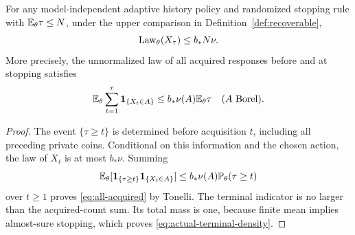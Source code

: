 \begin{lemma}\label{lem:stopped-mass}
For any model-independent adaptive history policy and randomized stopping rule with $\mathbb E_\theta\tau\le N$, under the upper comparison in Definition~\ref{def:recoverable},
\begin{equation}\label{eq:actual-terminal-density}
 \operatorname{Law}_\theta(X_\tau)\le b_*N\nu.
\end{equation}
More precisely, the unnormalized law of all acquired responses before and at stopping satisfies
\begin{equation}\label{eq:all-acquired}
 \mathbb E_\theta\sum_{t=1}^{\tau}\mathbf 1_{\{X_t\in A\}}
       \le b_*\nu(A)\mathbb E_\theta\tau
       \quad(A\text{ Borel}).
\end{equation}
\end{lemma}
\begin{proof}
The event $\{\tau\ge t\}$ is determined before acquisition $t$, including all preceding private coins. Conditional on this information and the chosen action, the law of $X_t$ is at most $b_*\nu$. Summing
\[
 \mathbb E_\theta[\mathbf 1_{\{\tau\ge t\}}\mathbf 1_{\{X_t\in A\}}]
       \le b_*\nu(A)\mathbb P_\theta(\tau\ge t)
\]
over $t\ge1$ proves \eqref{eq:all-acquired} by Tonelli. The terminal indicator is no larger than the acquired-count sum. Its total mass is one, because finite mean implies almost-sure stopping, which proves \eqref{eq:actual-terminal-density}.
\end{proof}

